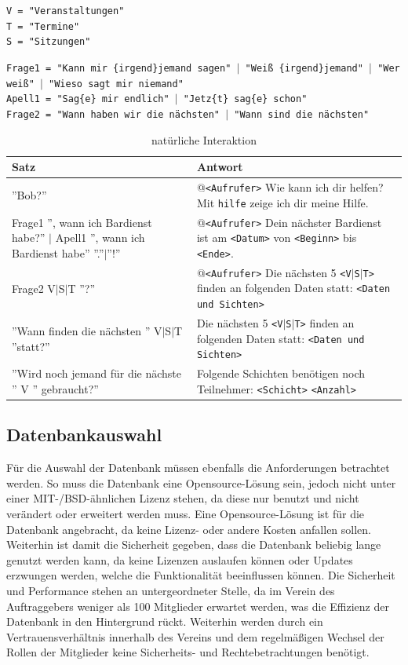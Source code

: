 \texttt{V = "Veranstaltungen"}\\
\texttt{T = "Termine"}\\
\texttt{S = "{}Sitzungen"}

\texttt{Frage1 = "Kann mir \{irgend\}jemand sagen" $|$ "Weiß \{irgend\}jemand" $|$ "Wer weiß" $|$ "Wieso sagt mir niemand"}\\
\texttt{Apell1 = "{}Sag\{e\} mir endlich" $|$ "Jetz\{t\} sag\{e\} schon"}\\
\texttt{Frage2 = "Wann haben wir die nächsten" $|$ "Wann sind die nächsten"}

\begin{table}[H]
\centering
\begin{tabularx}{\textwidth}{|p{5cm}|X|}
	\hline
	\textbf{Satz} & \textbf{Antwort} \\
	\hline
	''Bob?'' & @\texttt{<Aufrufer>} Wie kann ich dir helfen? Mit \texttt{hilfe} zeige ich dir meine Hilfe. \\
	\hline
	{Frage1 '', wann ich Bardienst habe?'' $|$ Apell1 '', wann ich Bardienst habe'' ''.''$|$''!''} & @\texttt{<Aufrufer>} Dein nächster Bardienst ist am \texttt{<Datum>} von \texttt{<Beginn>} bis \texttt{<Ende>}.\\
	\hline
	Frage2 V$|$S$|$T ''?'' & @\texttt{<Aufrufer>} Die nächsten 5 \texttt{<V$|$S$|$T>} finden an folgenden Daten statt: \texttt{<Daten und Sichten>}\\
	\hline
	''Wann finden die nächsten '' V$|$S$|$T ''statt?'' & Die nächsten 5 \texttt{<V$|$S$|$T>} finden an folgenden Daten statt: \texttt{<Daten und Sichten>}\\
	\hline
	''Wird noch jemand für die nächste '' V '' gebraucht?'' &  Folgende Schichten benötigen noch Teilnehmer: \texttt{<Schicht>} \texttt{<Anzahl>} \\
	\hline
\end{tabularx}
\caption{natürliche Interaktion}
\label{tab:natuerlicheinteraktion}
\end{table}


\subsection{Datenbankauswahl}
\label{datenbankauswahl}
Für die Auswahl der Datenbank müssen ebenfalls die Anforderungen betrachtet werden. So muss die Datenbank eine Opensource-Lösung sein, jedoch nicht unter einer MIT-/BSD-ähnlichen Lizenz stehen, da diese nur benutzt und nicht verändert oder erweitert werden muss. Eine Opensource-Lösung ist für die Datenbank angebracht, da keine Lizenz- oder andere Kosten anfallen sollen. Weiterhin ist damit die Sicherheit gegeben, dass die Datenbank beliebig lange genutzt werden kann, da keine Lizenzen auslaufen können oder Updates erzwungen werden, welche die Funktionalität beeinflussen können. Die Sicherheit und Performance stehen an untergeordneter Stelle, da im Verein des Auftraggebers weniger als 100 Mitglieder erwartet werden, was die Effizienz der Datenbank in den Hintergrund rückt. Weiterhin werden durch ein Vertrauensverhältnis innerhalb des Vereins und dem regelmäßigen Wechsel der Rollen der Mitglieder keine Sicherheits- und Rechtebetrachtungen benötigt.

